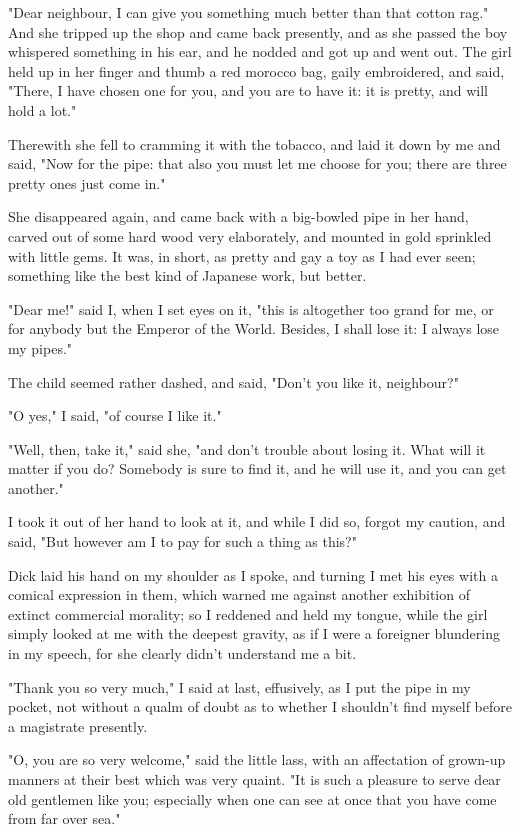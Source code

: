 "Dear neighbour, I can give you something much better than that cotton
rag." And she tripped up the shop and came back presently, and as she
passed the boy whispered something in his ear, and he nodded and got up
and went out. The girl held up in her finger and thumb a red morocco
bag, gaily embroidered, and said, "There, I have chosen one for you, and
you are to have it: it is pretty, and will hold a lot."

Therewith she fell to cramming it with the tobacco, and laid it down by
me and said, "Now for the pipe: that also you must let me choose for
you; there are three pretty ones just come in."

She disappeared again, and came back with a big-bowled pipe in her hand,
carved out of some hard wood very elaborately, and mounted in gold
sprinkled with little gems. It was, in short, as pretty and gay a toy as
I had ever seen; something like the best kind of Japanese work, but
better.

"Dear me!" said I, when I set eyes on it, "this is altogether too grand
for me, or for anybody but the Emperor of the World. Besides, I shall
lose it: I always lose my pipes."

The child seemed rather dashed, and said, "Don't you like it,
neighbour?"

"O yes," I said, "of course I like it."

"Well, then, take it," said she, "and don't trouble about losing it.
What will it matter if you do? Somebody is sure to find it, and he will
use it, and you can get another."

I took it out of her hand to look at it, and while I did so, forgot my
caution, and said, "But however am I to pay for such a thing as this?"

Dick laid his hand on my shoulder as I spoke, and turning I met his eyes
with a comical expression in them, which warned me against another
exhibition of extinct commercial morality; so I reddened and held my
tongue, while the girl simply looked at me with the deepest gravity, as
if I were a foreigner blundering in my speech, for she clearly didn't
understand me a bit.

"Thank you so very much," I said at last, effusively, as I put the pipe
in my pocket, not without a qualm of doubt as to whether I shouldn't
find myself before a magistrate presently.

"O, you are so very welcome," said the little lass, with an affectation
of grown-up manners at their best which was very quaint. "It is such a
pleasure to serve dear old gentlemen like you; especially when one can
see at once that you have come from far over sea."

